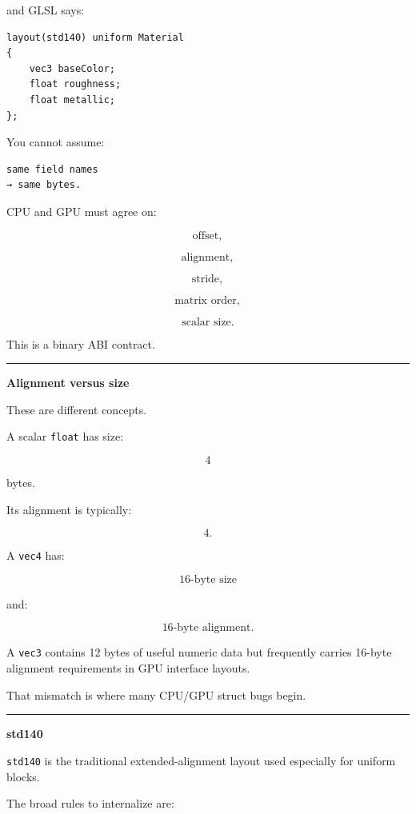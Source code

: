 and GLSL says:

\begin{verbatim}
layout(std140) uniform Material
{
    vec3 baseColor;
    float roughness;
    float metallic;
};
\end{verbatim}

You cannot assume:

\begin{verbatim}
same field names
→ same bytes.
\end{verbatim}

CPU and GPU must agree on:

\[
\text{offset},
\]

\[
\text{alignment},
\]

\[
\text{stride},
\]

\[
\text{matrix order},
\]

\[
\text{scalar size}.
\]

This is a binary ABI contract.

\begin{center}\rule{0.5\linewidth}{0.5pt}\end{center}

\textbf{Alignment versus size}

These are different concepts.

A scalar \texttt{float} has size:

\[
4
\]

bytes.

Its alignment is typically:

\[
4.
\]

A \texttt{vec4} has:

\[
16\text{-byte size}
\]

and:

\[
16\text{-byte alignment}.
\]

A \texttt{vec3} contains 12 bytes of useful numeric data but frequently carries 16-byte alignment requirements in GPU interface layouts.

That mismatch is where many CPU/GPU struct bugs begin.

\begin{center}\rule{0.5\linewidth}{0.5pt}\end{center}

\textbf{std140}

\texttt{std140} is the traditional extended-alignment layout used especially for uniform blocks.

The broad rules to internalize are:

